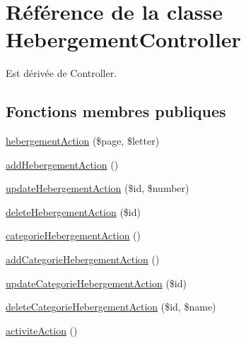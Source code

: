 \hypertarget{class_my_app_1_1_admin_bundle_1_1_controller_1_1_hebergement_controller}{\section{Référence de la classe Hebergement\-Controller}
\label{class_my_app_1_1_admin_bundle_1_1_controller_1_1_hebergement_controller}
}


Est dérivée de Controller.

\subsection*{Fonctions membres publiques}
\begin{DoxyCompactItemize}
\item 
\hyperlink{class_my_app_1_1_admin_bundle_1_1_controller_1_1_hebergement_controller_a2e5c224ada11f3e3933cb432c5da5e5b}{hebergement\-Action} (\$page, \$letter)
\item 
\hyperlink{class_my_app_1_1_admin_bundle_1_1_controller_1_1_hebergement_controller_ae73bf08ad6c08efcc5672ff8a73fe429}{add\-Hebergement\-Action} ()
\item 
\hyperlink{class_my_app_1_1_admin_bundle_1_1_controller_1_1_hebergement_controller_a24c88b27eca9721e4e86b04dcc646c9e}{update\-Hebergement\-Action} (\$id, \$number)
\item 
\hyperlink{class_my_app_1_1_admin_bundle_1_1_controller_1_1_hebergement_controller_a792c59ef0c10633e0ce754f728fcd195}{delete\-Hebergement\-Action} (\$id)
\item 
\hyperlink{class_my_app_1_1_admin_bundle_1_1_controller_1_1_hebergement_controller_abf0c9f6242cfce3eeaac5acb85dc4a85}{categorie\-Hebergement\-Action} ()
\item 
\hyperlink{class_my_app_1_1_admin_bundle_1_1_controller_1_1_hebergement_controller_ab3fd8caa5047ec4bbf74e85b01c97de8}{add\-Categorie\-Hebergement\-Action} ()
\item 
\hyperlink{class_my_app_1_1_admin_bundle_1_1_controller_1_1_hebergement_controller_a05fde8b6d28a4b2cd4ea718bb627d488}{update\-Categorie\-Hebergement\-Action} (\$id)
\item 
\hyperlink{class_my_app_1_1_admin_bundle_1_1_controller_1_1_hebergement_controller_a77c160d3ae3c04ac382ecc416c0591ad}{delete\-Categorie\-Hebergement\-Action} (\$id, \$name)
\item 
\hyperlink{class_my_app_1_1_admin_bundle_1_1_controller_1_1_hebergement_controller_a5fae9327ff36188702b7415b67365826}{activite\-Action} ()

\end{DoxyCompactItemize}
